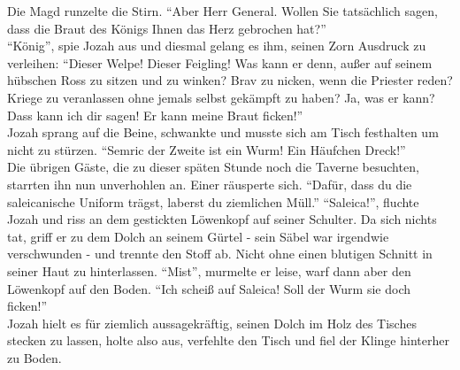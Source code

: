 Die Magd runzelte die Stirn. ``Aber Herr General. Wollen Sie tatsächlich sagen, dass die Braut des 
Königs Ihnen das Herz gebrochen hat?''\\
``König'', spie Jozah aus und diesmal gelang es ihm, seinen Zorn Ausdruck zu verleihen: ``Dieser 
Welpe! Dieser Feigling! Was kann er denn, außer auf seinem hübschen Ross zu sitzen und zu winken? 
Brav zu nicken, wenn die Priester reden? Kriege zu veranlassen ohne jemals selbst gekämpft zu 
haben? Ja, was er kann? Dass kann ich dir sagen! Er kann meine Braut ficken!''\\
Jozah sprang auf die Beine, schwankte und musste sich am Tisch festhalten um nicht zu stürzen. 
``Semric der Zweite ist ein Wurm! Ein Häufchen Dreck!''\\
Die übrigen Gäste, die zu dieser späten Stunde noch die Taverne besuchten, starrten ihn nun 
unverhohlen an. Einer räusperte sich. ``Dafür, dass du die saleicanische Uniform trägst, laberst du 
ziemlichen Müll.''
``Saleica!'', fluchte Jozah und riss an dem gestickten Löwenkopf auf seiner 
Schulter. Da sich nichts tat, griff er zu dem Dolch an seinem Gürtel - sein Säbel war irgendwie 
verschwunden - und trennte den Stoff ab. Nicht ohne einen blutigen Schnitt in seiner Haut zu 
hinterlassen. ``Mist'', murmelte er leise, warf dann aber den Löwenkopf auf den Boden. ``Ich scheiß 
auf Saleica! Soll der Wurm sie doch ficken!''\\
Jozah hielt es für ziemlich aussagekräftig, seinen Dolch im Holz des Tisches stecken zu lassen, 
holte also aus, verfehlte den Tisch und fiel der Klinge hinterher zu Boden.\\

